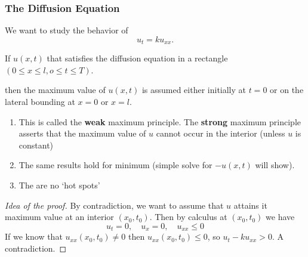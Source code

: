 \subsubsection{The Diffusion Equation}
\begin{problem}
	We want to study the behavior of \[ u_t = ku_{xx}.\]
\end{problem}
\begin{theorem}
	If $u(x,t)$ that satisfies the diffusion equation in a rectangle $(0 \leq x \leq l, o \leq t \leq T)$.
	\begin{center}
	\end{center}
	then the maximum value of $u(x,t)$ is assumed either initially at $t = 0$ or on the lateral bounding at $x = 0$ or $x = l$.
\end{theorem}
\begin{remark}
	\begin{enumerate}
		\item This is called the \textbf{weak} maximum principle. The \textbf{strong} maximum principle asserts that the maximum value of $u$ cannot occur in the interior (unless $u$ is constant)
		\item The same results hold for minimum (simple solve for $-u(x,t)$ will show).
		\item The are no `hot spots'
	\end{enumerate}
\end{remark}
\begin{proof}[Idea of the proof]
	By contradiction, we want to assume that $u$ attains it maximum value at an interior  $(x_0, t_0)$. Then by calculus at $(x_0, t_0)$ we have
	\[ u_t = 0, \quad u_x = 0, \quad u_{xx} \leq 0\]
	If we know that $u_{xx}(x_0, t_0) \neq 0$ then $u_{xx} (x_0 ,t_0) \leq 0$, so $u_{t} - k u_{xx} > 0$. A contradiction.
\end{proof}
